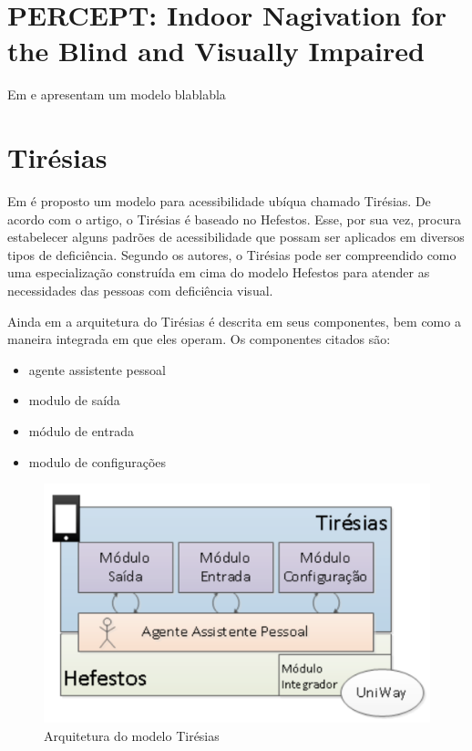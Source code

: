 \documentclass[english,brazilian]{UNISINOSmonografia}
\begin{document}
	\section{PERCEPT: Indoor Nagivation for the Blind and Visually Impaired}
Em  e  apresentam um modelo blablabla

		\cite{Ganz2011}

			
		\cite{Ganz2012}


	\section{Tirésias}
	Em  é proposto um modelo para acessibilidade ubíqua chamado Tirésias. De acordo com o artigo, o Tirésias é baseado no Hefestos. Esse, por sua vez, procura estabelecer alguns padrões de acessibilidade que possam ser aplicados em diversos tipos de deficiência. Segundo os autores, o Tirésias pode ser compreendido como uma especialização construída em cima do modelo Hefestos para atender as necessidades das pessoas com deficiência visual. 

	Ainda em  a arquitetura do Tirésias é descrita em seus componentes, bem como a maneira integrada em que eles operam. Os componentes citados são:

	\begin{itemize} 
		\item agente assistente pessoal
		\item modulo de saída
		\item módulo de entrada
		\item modulo de configurações
	\end{itemize}

	\FloatBarrier
	\begin{figure}[!ht]
		\caption{Arquitetura do modelo Tirésias}
		\label{fig:visaoGeral}
		\centering%
		\begin{minipage}{.6\textwidth}
			\includegraphics[width=\textwidth]{tiresiasArquitetura}
		\end{minipage}
	\end{figure}
	\FloatBarrier
\end{document}
